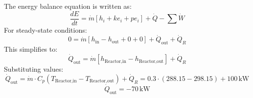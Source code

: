 The energy balance equation is written as:  
\[
\frac{dE}{dt} = \dot{m} \left[ h_i + ke_i + pe_i \right] + \dot{Q} - \sum \dot{W}
\]  
For steady-state conditions:  
\[
0 = \dot{m} \left[ h_{\text{in}} - h_{\text{out}} + 0 + 0 \right] + \dot{Q}_{\text{out}} + \dot{Q}_R
\]  
This simplifies to:  
\[
\dot{Q}_{\text{out}} = \dot{m} \left[ h_{\text{Reactor,in}} - h_{\text{Reactor,out}} \right] + \dot{Q}_R
\]  
Substituting values:  
\[
\dot{Q}_{\text{out}} = \dot{m} \cdot C_p \left( T_{\text{Reactor,in}} - T_{\text{Reactor,out}} \right) + \dot{Q}_R = 0.3 \cdot \left( 288.15 - 298.15 \right) + 100 \, \text{kW}
\]  
\[
\dot{Q}_{\text{out}} = -70 \, \text{kW}
\]